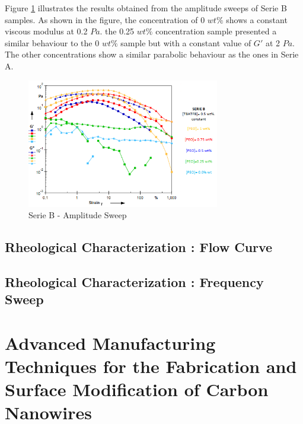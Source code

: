Figure \ref{fig:SerieBampSweep} illustrates the results obtained from the amplitude sweeps of Serie B samples. As shown in the figure, the concentration of 0 $w t \%$ shows a constant viscous modulus at 0.2 $Pa$. the 0.25 $w t \%$ concentration sample presented a similar behaviour to the 0 $w t \%$ sample but with a constant value of $G'$ at 2 $Pa$. The other concentrations show a similar parabolic behaviour as the ones in Serie A.

\begin{figure}[th]
\centering
\includegraphics[width=0.75\textwidth]{./Figures/SerieBampSweep.png}
\decoRule
\caption[Serie B - Amplitude Sweep]{Serie B - Amplitude Sweep}
\label{fig:SerieBampSweep}
\end{figure}


\subsection{Rheological Characterization : \textbf{Flow Curve}}


\subsection{Rheological Characterization : \textbf{Frequency Sweep}}



\clearpage

\section{Advanced Manufacturing Techniques for the Fabrication and Surface Modification of Carbon Nanowires \cite{Cardenas2017}}




